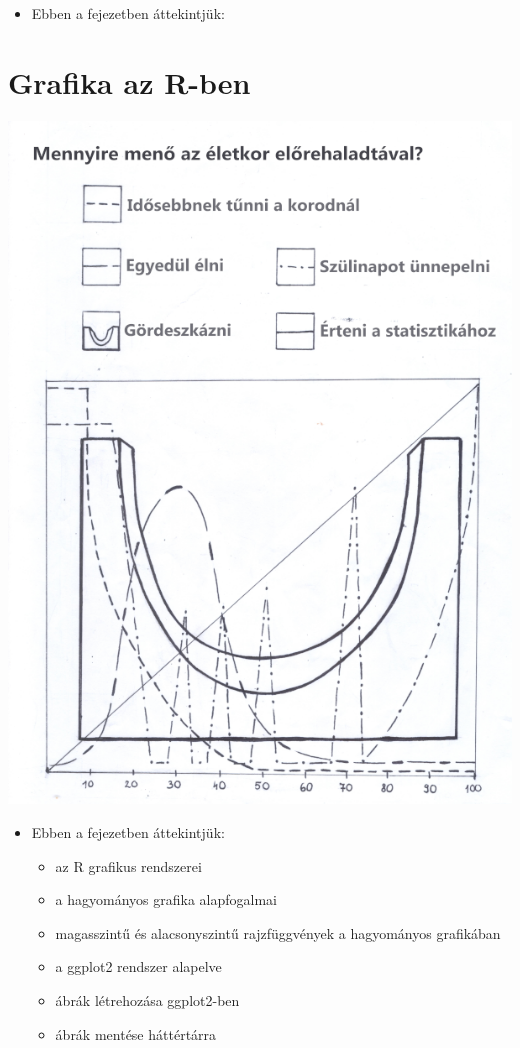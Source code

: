 \documentclass[
]{book}
\providecommand{\tightlist}{%
  \setlength{\itemsep}{0pt}\setlength{\parskip}{0pt}}
\newenvironment{rmdblock}[1]
  {\begin{shaded*}
  \begin{itemize}
  \renewcommand{\labelitemi}{
    \raisebox{-.7\height}[0pt][0pt]{
      {\setkeys{Gin}{width=3em,keepaspectratio}\texttt{[image: images/\#1]}}
    }
  }
  \item
  }
  {
  \end{itemize}
  \end{shaded*}
  }
\newenvironment{rmdlevel1}
  {\begin{rmdblock}{level1}}
  {\end{rmdblock}}
\begin{document}
\begin{rmdlevel1}
Ebben a fejezetben áttekintjük:
\end{rmdlevel1}

\hypertarget{grafika-az-r-ben}{%
\chapter{Grafika az R-ben}\label{grafika-az-r-ben}}

\begin{center}\includegraphics[width=0.7\linewidth]{images/ch_09_small} \end{center}

\begin{rmdlevel1}
Ebben a fejezetben áttekintjük:

\begin{itemize}
\tightlist
\item
  az R grafikus rendszerei
\item
  a hagyományos grafika alapfogalmai
\item
  magasszintű és alacsonyszintű rajzfüggvények a hagyományos grafikában
\item
  a ggplot2 rendszer alapelve
\item
  ábrák létrehozása ggplot2-ben
\item
  ábrák mentése háttértárra
\end{itemize}
\end{rmdlevel1}
\end{document}
